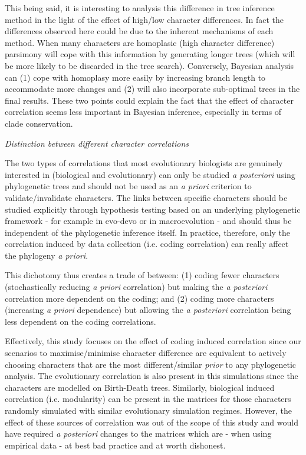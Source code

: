 \documentclass[12pt,letterpaper]{article}
\renewcommand{\subsection}[1]{%
\bigskip
\begin{center}
\begin{large}
\normalfont\itshape #1
\end{large}
\end{center}}
\begin{document}
This being said, it is interesting to analysis this difference in tree inference method in the light of the effect of high/low character differences.
In fact the differences observed here could be due to the inherent mechanisms of each method.
When many characters are homoplasic (high character difference) parsimony will cope with this information by generating longer trees (which will be more likely to be discarded in the tree search).
Conversely, Bayesian analysis can (1) cope with homoplasy more easily by increasing branch length to accommodate more changes and (2) will also incorporate sub-optimal trees in the final results.
These two points could explain the fact that the effect of character correlation seems less important in Bayesian inference, especially in terms of clade conservation.

\subsection{Distinction between different character correlations}
The two types of correlations that most evolutionary biologists are genuinely interested in (biological and evolutionary) can only be studied \textit{a posteriori} using phylogenetic trees and should not be used as an \textit{a priori} criterion to validate/invalidate characters.
The links between specific characters should be studied explicitly through hypothesis testing based on an underlying phylogenetic framework - for example in evo-devo \citep[e.g.][]{goswami2006morphological} or in macroevolution \citep[e.g.][]{fitzjohn2014much} - and should thus be independent of the phylogenetic inference itself.
In practice, therefore, only the correlation induced by data collection (i.e. coding correlation) can really affect the phylogeny \textit{a priori}.

This dichotomy thus creates a trade of between: (1) coding fewer characters (stochastically reducing \textit{a priori} correlation) but making the \textit{a posteriori} correlation more dependent on the coding; and (2) coding more characters (increasing \textit{a priori} dependence) but allowing the \textit{a posteriori} correlation being less dependent on the coding correlations.

Effectively, this study focuses on the effect of coding induced correlation since our scenarios to maximise/minimise character difference are equivalent to actively choosing characters that are the most different/similar \textit{prior} to any phylogenetic analysis.
The evolutionary correlation is also present in this simulations since the characters are modelled on Birth-Death trees.
Similarly, biological induced correlation (i.e. modularity) can be present in the matrices for those characters randomly simulated with similar evolutionary simulation regimes.
However, the effect of these sources of correlation was out of the scope of this study and would have required \textit{a posteriori} changes to the matrices which are - when using empirical data - at best bad practice and at worth dishonest.
\end{document}
